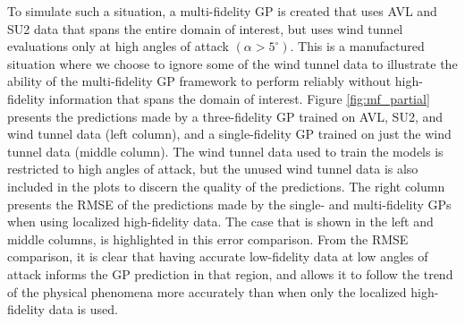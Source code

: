 To simulate such a situation, a multi-fidelity GP is created that uses AVL and SU2 data that spans the entire domain of interest, but uses wind tunnel evaluations only at high angles of attack $(\alpha > 5^\circ)$. This is a manufactured situation where we choose to ignore some of the wind tunnel data to illustrate the ability of the multi-fidelity GP framework to perform reliably without high-fidelity information that spans the domain of interest. Figure \ref{fig:mf_partial} presents the predictions made by a three-fidelity GP trained on AVL, SU2, and wind tunnel data (left column), and a single-fidelity GP trained on just the wind tunnel data (middle column). The wind tunnel data used to train the models is restricted to high angles of attack, but the unused wind tunnel data is also included in the plots to discern the quality of the predictions. The right column presents the RMSE of the predictions made by the single- and multi-fidelity GPs when using localized high-fidelity data. The case that is shown in the left and middle columns, is highlighted in this error comparison. From the RMSE comparison, it is clear that having accurate low-fidelity data at low angles of attack informs the GP prediction in that region, and allows it to follow the trend of the physical phenomena more accurately than when only the localized high-fidelity data is used. 

